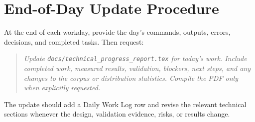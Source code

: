 \documentclass[11pt,a4paper]{article}
\begin{document}
\section{End-of-Day Update Procedure}
At the end of each workday, provide the day's commands, outputs, errors, decisions, and completed tasks. Then request:
\begin{quote}
\textit{Update \texttt{docs/technical\_progress\_report.tex} for today's work. Include completed work, measured results, validation, blockers, next steps, and any changes to the corpus or distribution statistics. Compile the PDF only when explicitly requested.}
\end{quote}
The update should add a Daily Work Log row and revise the relevant technical sections whenever the design, validation evidence, risks, or results change.
\end{document}
